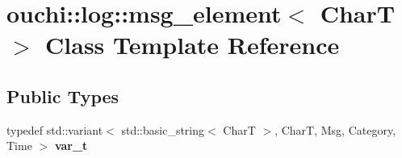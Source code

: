 \hypertarget{classouchi_1_1log_1_1msg__element}{}\section{ouchi\+::log\+::msg\+\_\+element$<$ CharT $>$ Class Template Reference}
\label{classouchi_1_1log_1_1msg__element}
\subsection*{Public Types}
\begin{DoxyCompactItemize}
\item 
\mbox{\label{classouchi_1_1log_1_1msg__element_aec66cab48368d938bfec2f6d64be0bb1}} 
typedef std\+::variant$<$ std\+::basic\+\_\+string$<$ CharT $>$, CharT, Msg, Category, Time $>$ {\bfseries var\+\_\+t}
\end{DoxyCompactItemize}
